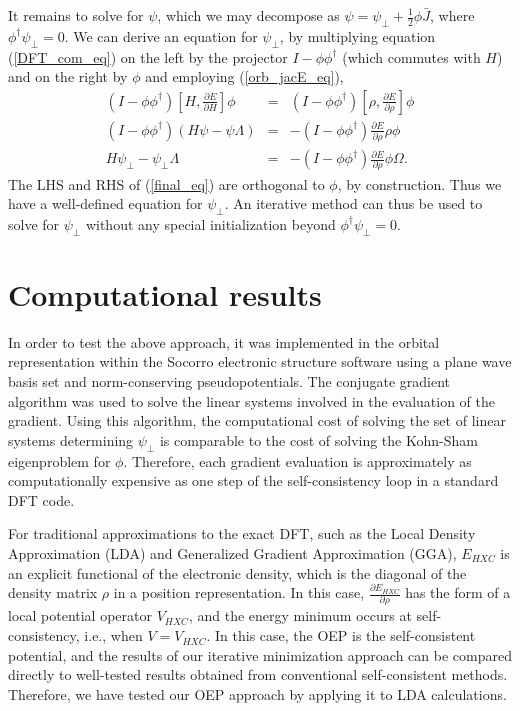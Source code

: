 \documentclass{article}
\newcommand{\bea}{\begin{eqnarray}} \newcommand{\ena}{\end{eqnarray}}
\newcommand{\half}{{\frac{1}{2}}} \newcommand{\quarter}{{\frac{1}{4}}}
\newcommand{\Vscp}{V}
\begin{document}
It remains to solve for $\psi$, which we may decompose as
$\psi = \psi_{\perp}+\half \phi \bar{J}$,
where $\phi^\dagger \psi_{\perp}=0$.
We can derive an equation for $\psi_{\perp}$,
by multiplying equation (\ref{DFT_com_eq})
on the left by the projector
$I - \phi \phi^\dagger$ (which commutes with $H$) and on the
right by $\phi$ and employing (\ref{orb_jacE_eq}),
\bea
 (I-\phi \phi^\dagger)
 \left[H,\frac{\partial E}{\partial H}\right] \phi 
  &=&
 (I-\phi \phi^\dagger)
 \left[\rho, \frac{\partial E}{\partial \rho}\right]\phi
\\
 (I-\phi \phi^\dagger)
 \left(H \psi - \psi \Lambda\right)
  &=&
 -(I - \phi \phi^\dagger) \frac{\partial E}{\partial \rho} \rho \phi
\\
\label{final_eq}
 H \psi_{\perp} - \psi_{\perp} \Lambda
  &=&
 -(I - \phi \phi^\dagger) \frac{\partial E}{\partial \rho} \phi \Omega.
\ena
The LHS and RHS of (\ref{final_eq}) are orthogonal to $\phi$,
by construction.
Thus we have a well-defined
equation for $\psi_{\perp}$.
An iterative method can thus be used to solve for $\psi_{\perp}$ without any
special initialization beyond $\phi^\dagger \psi_{\perp} = 0$.


\section{Computational results}

In order to test the above approach, it was implemented in the orbital representation
within the Socorro electronic
structure software using a plane wave basis set and norm-conserving pseudopotentials.
The conjugate gradient algorithm was used to solve the linear systems involved in the
evaluation of the gradient.  Using this algorithm, the computational cost of solving
the set of linear systems determining $\psi_{\perp}$ is comparable to the cost of
solving the Kohn-Sham eigenproblem for $\phi$.  Therefore, each gradient evaluation
is approximately as computationally expensive as one step of the self-consistency
loop in a standard DFT code.

For traditional approximations to the exact DFT,
such as the Local Density Approximation (LDA) and Generalized Gradient Approximation (GGA),
$E_{HXC}$ is an explicit functional of the electronic density, which is the diagonal of
the density matrix $\rho$ in a position representation.  In this case,
$\frac{\partial E_{HXC}}{\partial \rho}$ has the form of a local potential operator $V_{HXC}$,
and the energy minimum occurs at self-consistency, i.e., when $\Vscp = V_{HXC}$.
In this case, the OEP is the self-consistent potential, and the results of our iterative
minimization approach can be compared directly to well-tested results obtained from
conventional self-consistent methods.  Therefore, we have tested our OEP approach by applying
it to LDA calculations.
\end{document}
